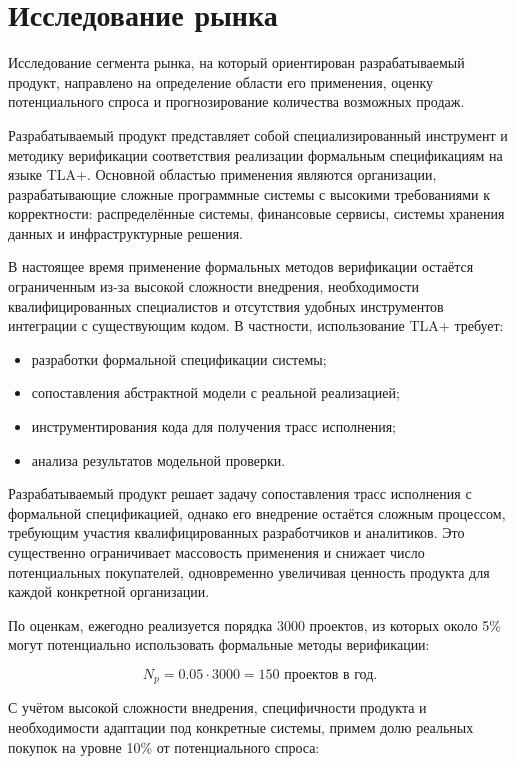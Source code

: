 \section{Исследование рынка}

Исследование сегмента рынка, на который ориентирован разрабатываемый
продукт, направлено на определение области его применения, оценку
потенциального спроса и прогнозирование количества возможных продаж.

Разрабатываемый продукт представляет собой специализированный
инструмент и методику верификации соответствия реализации формальным
спецификациям на языке TLA+. Основной областью применения являются
организации, разрабатывающие сложные программные системы с высокими
требованиями к корректности: распределённые системы, финансовые
сервисы, системы хранения данных и инфраструктурные решения.

В настоящее время применение формальных методов верификации остаётся
ограниченным из-за высокой сложности внедрения, необходимости
квалифицированных специалистов и отсутствия удобных инструментов
интеграции с существующим кодом. В частности, использование TLA+
требует:
\begin{itemize}
\item разработки формальной спецификации системы;
\item сопоставления абстрактной модели с реальной реализацией;
\item инструментирования кода для получения трасс исполнения;
\item анализа результатов модельной проверки.
\end{itemize}

Разрабатываемый продукт решает задачу сопоставления трасс исполнения с
формальной спецификацией, однако его внедрение остаётся сложным
процессом, требующим участия квалифицированных разработчиков и
аналитиков. Это существенно ограничивает массовость применения и
снижает число потенциальных покупателей, одновременно увеличивая
ценность продукта для каждой конкретной организации.

По оценкам, ежегодно реализуется порядка 3000 проектов, из которых
около 5\% могут потенциально использовать формальные методы
верификации:

\begin{equation}
N_p = 0.05 \cdot 3000 = 150 \text{ проектов в год}.
\end{equation}

С учётом высокой сложности внедрения, специфичности продукта и
необходимости адаптации под конкретные системы, примем долю реальных
покупок на уровне 10\% от потенциального спроса:

